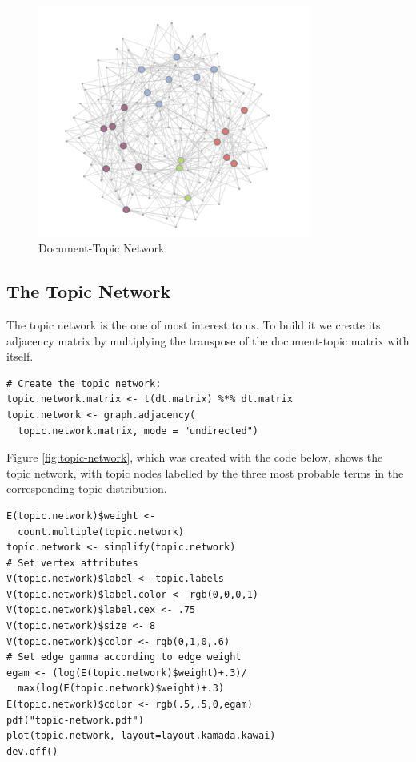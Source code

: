 \documentclass[%
	final,
	notitlepage,
	narroweqnarray,
	inline,
	]{ieee}
\begin{document}
\begin{figure}
\centering
\includegraphics[width=90mm]{dtn.pdf}
\caption{Document-Topic Network}
\label{fig:dtn}
\end{figure}


\subsection{The Topic Network}

\PARstart The topic network is the one of most interest to us.  To build it
we create its adjacency matrix by multiplying the transpose of the document-topic
matrix with itself.

\begin{verbatim}
# Create the topic network:
topic.network.matrix <- t(dt.matrix) %*% dt.matrix
topic.network <- graph.adjacency(
  topic.network.matrix, mode = "undirected")
\end{verbatim}

Figure \ref{fig:topic-network}, which was created with the code below, shows the 
topic network, with 
topic nodes labelled by the three most probable terms in the corresponding
topic distribution.

\begin{verbatim}
E(topic.network)$weight <- 
  count.multiple(topic.network)
topic.network <- simplify(topic.network)
# Set vertex attributes
V(topic.network)$label <- topic.labels
V(topic.network)$label.color <- rgb(0,0,0,1)
V(topic.network)$label.cex <- .75
V(topic.network)$size <- 8
V(topic.network)$color <- rgb(0,1,0,.6)
# Set edge gamma according to edge weight
egam <- (log(E(topic.network)$weight)+.3)/
  max(log(E(topic.network)$weight)+.3)
E(topic.network)$color <- rgb(.5,.5,0,egam)
pdf("topic-network.pdf")
plot(topic.network, layout=layout.kamada.kawai)
dev.off()
\end{verbatim}
\end{document}
